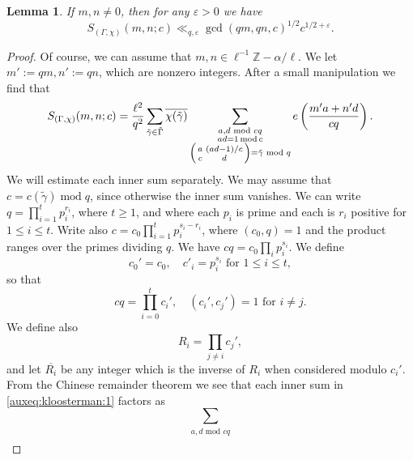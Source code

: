 \documentclass{article}
\newtheorem{lem}[thm]{Lemma}
\theoremstyle{named}
\newcommand{\Z}{\mathbb{Z}}
\DeclareMathOperator{\modulo}{mod}
\begin{document}
\begin{lem}\label{lem:weilbound}
If $m, n \neq 0$, then for any $\varepsilon > 0$ we have
\begin{equation*}
 S_{(\Gamma, \chi)}(m, n; c) \ll_{q, \varepsilon} \gcd(qm, qn, c)^{1/2}c^{1/2 + \varepsilon}.
\end{equation*}
\end{lem}

\begin{proof}
Of course, we can assume that $m, n \in \ell^{-1}\Z - \alpha/\ell$. We let $m' := qm, n' := qn$, which are nonzero integers. After a small manipulation we find that 
\begin{equation}\label{auxeq:kloosterman:1}
    S_{(\Gamma, \chi)}(m, n; c)  = \frac{\ell^2}{q^2}\sum_{\tilde{\gamma} \in \tilde{\Gamma}}\overline{\chi(\tilde{\gamma})}\sum_{\substack{a, d \text{ mod }cq\\
    ad = 1 \modulo c\\
    \begin{psmallmatrix}
        a & (ad-1)/c\\
        c & d
    \end{psmallmatrix} = \tilde{\gamma} \text{ mod }q}} e\left(\frac{m'a + n'd}{cq}\right).
\end{equation}
We will estimate each inner sum separately. We may assume that $c = c(\widetilde{\gamma}) \modulo q$, since otherwise the inner sum vanishes. We can write $q = \prod_{i= 1}^t p_i^{r_i}$, where $t\geq 1$, and where each $p_i$ is prime and each is $r_i$ positive for $1 \leq i \leq t$. Write also $c = c_0 \prod_{i = 1}^t p_i^{s_i - r_i}$, where $(c_0, q) = 1$ and the product ranges over the primes dividing $q$. We have
$cq = c_0 \prod_i p_i^{s_i}$. We define
\begin{equation*}
    c_0' = c_0, \quad c'_i  = p_i^{s_i} \text{ for }1\leq i \leq t,
\end{equation*}
so that 
\begin{equation*}
    cq = \prod_{i=0}^t c_i', \quad (c_i', c_j') = 1 \text{ for } i\not = j.
\end{equation*}
We define also 
\begin{equation*}
    R_i = \prod_{j \neq i} c_j',
\end{equation*}
and let $\overline{R_i}$ be any integer which is the inverse of $R_i$ when considered modulo $c_i'$. From the Chinese remainder theorem we see that each inner sum in \eqref{auxeq:kloosterman:1} factors as 
\begin{equation*}
    \sum_{\substack{a, d \text{ mod }cq\\
}}
\end{equation*}
\end{proof}
\end{document}
